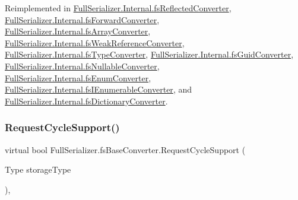 Reimplemented in \hyperlink{class_full_serializer_1_1_internal_1_1fs_reflected_converter_ad5d48348410d9fc61794476ee9b282d6}{Full\+Serializer.\+Internal.\+fs\+Reflected\+Converter}, \hyperlink{class_full_serializer_1_1_internal_1_1fs_forward_converter_ac060a50ae6f3241ea0f9465e1d261d12}{Full\+Serializer.\+Internal.\+fs\+Forward\+Converter}, \hyperlink{class_full_serializer_1_1_internal_1_1fs_array_converter_a03e9dd52440176acd87f3047ababe392}{Full\+Serializer.\+Internal.\+fs\+Array\+Converter}, \hyperlink{class_full_serializer_1_1_internal_1_1fs_weak_reference_converter_a8732fca2359367dbf78c687898625406}{Full\+Serializer.\+Internal.\+fs\+Weak\+Reference\+Converter}, \hyperlink{class_full_serializer_1_1_internal_1_1fs_type_converter_af2049f4529f9138347b63bee54aa7397}{Full\+Serializer.\+Internal.\+fs\+Type\+Converter}, \hyperlink{class_full_serializer_1_1_internal_1_1fs_guid_converter_a86f7beefe9d841a8f3235a805ec43691}{Full\+Serializer.\+Internal.\+fs\+Guid\+Converter}, \hyperlink{class_full_serializer_1_1_internal_1_1fs_nullable_converter_ab47b05197a1f68036cecb45318b49233}{Full\+Serializer.\+Internal.\+fs\+Nullable\+Converter}, \hyperlink{class_full_serializer_1_1_internal_1_1fs_enum_converter_a1d20e736fc995f6d127a312ae19f55b2}{Full\+Serializer.\+Internal.\+fs\+Enum\+Converter}, \hyperlink{class_full_serializer_1_1_internal_1_1fs_i_enumerable_converter_a787950b2cb51b536dc9fc01f5870f0d9}{Full\+Serializer.\+Internal.\+fs\+I\+Enumerable\+Converter}, and \hyperlink{class_full_serializer_1_1_internal_1_1fs_dictionary_converter_aa35564498ee62b6d5e072e845ef0d8f6}{Full\+Serializer.\+Internal.\+fs\+Dictionary\+Converter}.

\mbox{\label{class_full_serializer_1_1fs_base_converter_a4e850ab88cea1b89771c00e0b65febcd}} 
\subsubsection{\texorpdfstring{Request\+Cycle\+Support()}{RequestCycleSupport()}}
{\footnotesize\ttfamily virtual bool Full\+Serializer.\+fs\+Base\+Converter.\+Request\+Cycle\+Support (\begin{DoxyParamCaption}\item[{Type}]{storage\+Type }\end{DoxyParamCaption})\hspace{0.3cm}{\ttfamily [inline]}, {\ttfamily [virtual]}}



